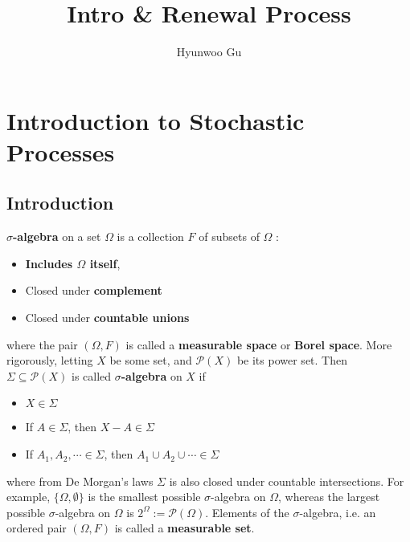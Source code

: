 \documentclass[12pt]{article}
\theoremstyle{nonumberbreak}
\begin{document}
\title{\textbf{Intro \& Renewal Process}}
\author{Hyunwoo Gu}
\date{}

\maketitle

\section{Introduction to Stochastic Processes}




\subsection{Introduction}

\textbf{$\sigma$-algebra} on a set $\Omega$ is a collection $F$ of subsets of $\Omega$ :

\begin{itemize}
	\item \textbf{Includes $\Omega$ itself},
	\item Closed under \textbf{complement}
	\item Closed under \textbf{countable unions}
\end{itemize}

where the pair $(\Omega, F)$ is called a \textbf{measurable space} or \textbf{Borel space}. More rigorously, letting $X$ be some set, and $\mathcal{P}(X)$ be its power set. Then $\Sigma \subseteq \mathcal{P}(X)$ is called \textbf{$\sigma$-algebra} on $X$ if

\begin{itemize}
	\item $X \in \Sigma$
	\item If $A \in \Sigma$, then $X - A \in \Sigma$ 
	\item If $A_1, A_2, \cdots \in \Sigma$, then $A_1 \cup A_2 \cup \cdots \in \Sigma$
\end{itemize}

where from De Morgan's laws $\Sigma$ is also closed under countable intersections. For example, $\{ \Omega, \emptyset \}$ is the smallest possible $\sigma$-algebra on $\Omega$, whereas the largest possible $\sigma$-algebra on $\Omega$ is $2^\Omega := \mathcal{P}(\Omega)$. Elements of the $\sigma$-algebra, i.e. an ordered pair $(\Omega, F)$ is called a \textbf{measurable set}.
\end{document}
